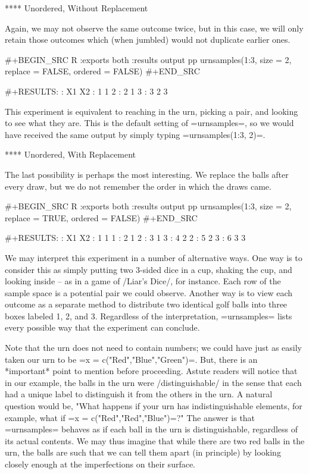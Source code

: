 **** Unordered, Without Replacement

Again, we may not observe the same outcome twice, but in this case, we
will only retain those outcomes which (when jumbled) would not
duplicate earlier ones.

#+BEGIN_SRC R :exports both :results output pp   
urnsamples(1:3, size = 2, replace = FALSE, ordered = FALSE) 
#+END_SRC 

#+RESULTS:
:   X1 X2
: 1  1  2
: 2  1  3
: 3  2  3

This experiment is equivalent to reaching in the urn, picking a pair,
and looking to see what they are. This is the default setting of
=urnsamples=, so we would have received the same output by simply
typing =urnsamples(1:3, 2)=.

**** Unordered, With Replacement

The last possibility is perhaps the most interesting. We replace the
balls after every draw, but we do not remember the order in which the
draws came.

#+BEGIN_SRC R :exports both :results output pp   
urnsamples(1:3, size = 2, replace = TRUE, ordered = FALSE) 
#+END_SRC

#+RESULTS:
:   X1 X2
: 1  1  1
: 2  1  2
: 3  1  3
: 4  2  2
: 5  2  3
: 6  3  3

We may interpret this experiment in a number of alternative ways. One
way is to consider this as simply putting two 3-sided dice in a cup,
shaking the cup, and looking inside -- as in a game of /Liar's Dice/,
for instance. Each row of the sample space is a potential pair we
could observe. Another way is to view each outcome as a separate
method to distribute two identical golf balls into three boxes labeled
1, 2, and 3. Regardless of the interpretation, =urnsamples= lists
every possible way that the experiment can conclude.



Note that the urn does not need to contain numbers; we could have just
as easily taken our urn to be =x = c("Red","Blue","Green")=. But,
there is an *important* point to mention before proceeding. Astute
readers will notice that in our example, the balls in the urn were
/distinguishable/ in the sense that each had a unique label to
distinguish it from the others in the urn. A natural question would
be, "What happens if your urn has indistinguishable elements, for
example, what if =x = c("Red","Red","Blue")=?" The answer is that
=urnsamples= behaves as if each ball in the urn is distinguishable,
regardless of its actual contents. We may thus imagine that while
there are two red balls in the urn, the balls are such that we can
tell them apart (in principle) by looking closely enough at the
imperfections on their surface.

